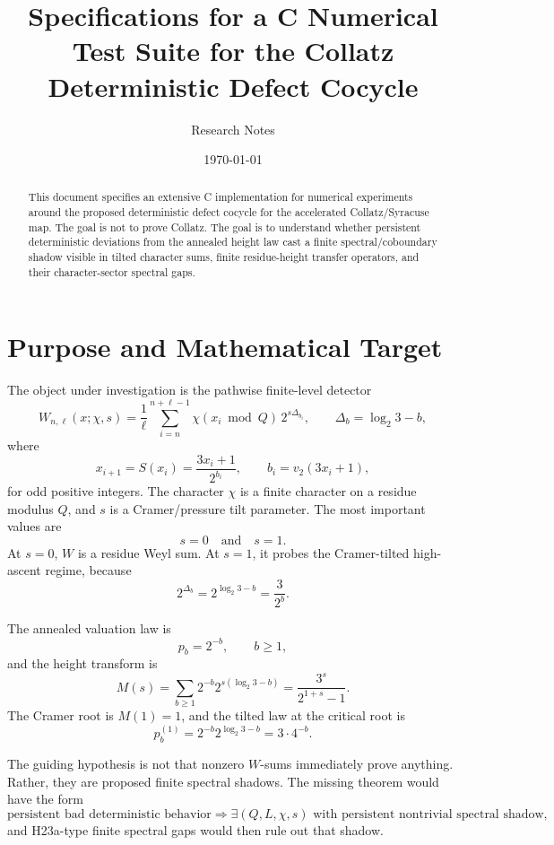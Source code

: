 \documentclass[11pt]{article}
\title{Specifications for a C Numerical Test Suite for the Collatz Deterministic Defect Cocycle}
\author{Research Notes}
\date{\today}
\newcommand{\vtwo}{v_2}
\begin{document}
\maketitle

\begin{abstract}
This document specifies an extensive C implementation for numerical experiments around the proposed deterministic defect cocycle for the accelerated Collatz/Syracuse map.  The goal is not to prove Collatz.  The goal is to understand whether persistent deterministic deviations from the annealed height law cast a finite spectral/coboundary shadow visible in tilted character sums, finite residue-height transfer operators, and their character-sector spectral gaps.
\end{abstract}

\tableofcontents

\section{Purpose and Mathematical Target}

The object under investigation is the pathwise finite-level detector
\[
        W_{n,\ell}(x;\chi,s)
        =
        \frac{1}{\ell}\sum_{i=n}^{n+\ell-1}
        \chi(x_i \bmod Q)\,2^{s\Delta_{b_i}},
        \qquad
        \Delta_b=\log_2 3-b,
\]
where
\[
        x_{i+1}=S(x_i)=\frac{3x_i+1}{2^{b_i}},
        \qquad b_i=\vtwo(3x_i+1),
\]
for odd positive integers.  The character \(\chi\) is a finite character on a residue modulus \(Q\), and \(s\) is a Cramer/pressure tilt parameter.  The most important values are
\[
        s=0 \quad \text{and} \quad s=1.
\]
At \(s=0\), \(W\) is a residue Weyl sum.  At \(s=1\), it probes the Cramer-tilted high-ascent regime, because
\[
        2^{\Delta_b}=2^{\log_2 3-b}=\frac{3}{2^b}.
\]

The annealed valuation law is
\[
        p_b=2^{-b}, \qquad b\ge1,
\]
and the height transform is
\[
        M(s)=\sum_{b\ge1}2^{-b}2^{s(\log_2 3-b)}
        =\frac{3^s}{2^{1+s}-1}.
\]
The Cramer root is \(M(1)=1\), and the tilted law at the critical root is
\[
        p_b^{(1)}=2^{-b}2^{\log_2 3-b}=3\cdot4^{-b}.
\]

The guiding hypothesis is not that nonzero \(W\)-sums immediately prove anything.  Rather, they are proposed finite spectral shadows.  The missing theorem would have the form
\[
        \text{persistent bad deterministic behavior}
        \Longrightarrow
        \exists(Q,L,\chi,s)\text{ with persistent nontrivial spectral shadow},
\]
and H23a-type finite spectral gaps would then rule out that shadow.
\end{document}
